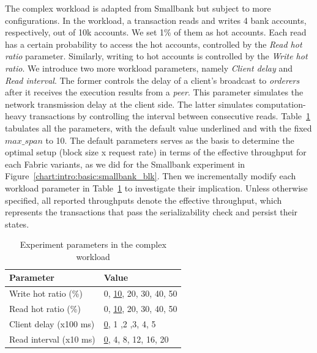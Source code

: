 The complex workload 
is adapted from Smallbank but subject to more configurations.
In the workload, a transaction reads and writes 4 bank accounts, respectively, out of 10k accounts.
We set 1\% of them as hot accounts.
Each read has a certain probability to access the
hot accounts, controlled by the \textit{Read hot ratio} parameter. 
Similarly, writing to hot accounts is controlled by the \textit{Write hot ratio}. 
We introduce two more workload parameters, namely \textit{Client delay} and \textit{Read interval}.
The former controls the delay of a client's broadcast to \textit{orderers} after
it receives the execution results from a \textit{peer}.
This parameter simulates the network transmission delay at the client side. 
The latter simulates computation-heavy transactions by controlling the interval
between consecutive reads. 
Table~\ref{tab:txn:parameter} tabulates all the parameters, with the default value underlined and with the fixed $max\_span$ to 10. 
The default parameters serves as the basis to determine the optimal setup (block size x request rate) in terms of the effective throughput for each Fabric variants, as we did for the Smallbank experiment in Figure~\ref{chart:intro:basic:smallbank_blk}. 
Then we incrementally modify each workload parameter in Table~\ref{tab:txn:parameter} to investigate their implication. 
Unless otherwise specified, all reported throughputs denote the effective throughput, which represents the transactions that pass the serializability check and persist their states.

\begin{table}
	\centering
	\caption{Experiment parameters in the complex workload}
	\label{tab:txn:parameter}
	\begin{tabular}{@{}ll@{}}
	\toprule
	\textbf{Parameter}
  & \textbf{Value} \\
	\midrule

  Write hot ratio (\%)
  & 0, \underline{10}, 20, 30, 40, 50 \\

	Read hot ratio (\%)
  & 0, \underline{10}, 20, 30, 40, 50 \\

  Client delay (x100 ms)
  & \underline{0}, 1 ,2 ,3, 4, 5 \\

	Read interval (x10 ms)
  & \underline{0}, 4, 8, 12, 16, 20 \\

	\bottomrule
	\end{tabular}
\end{table}

